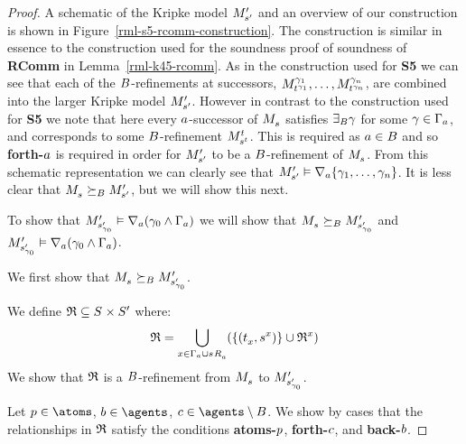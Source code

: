 \begin{proof}
A schematic of the Kripke model $\kPModelP{\kStateSP}$ and an overview of our construction is shown in Figure~\ref{rml-s5-rcomm-construction}.
The construction is similar in essence to the construction used for the soundness proof of soundness of {\bf RComm} in Lemma~\ref{rml-k45-rcomm}.
As in the construction used for {\bf S5} we can see that each of the $\agentsB$-refinements at successors, $\kPModel[\gamma_1]{\kStateT[\gamma_1]}, \dots, \kPModel[\gamma_n]{\kStateT[\gamma_n]}$, are combined into the larger Kripke model $\kPModelP{\kStateSP}$.
However in contrast to the construction used for {\bf S5} we note that here every $\agentA$-successor of $\kPModel{\kStateS}$ satisfies $\somerefsBs \gamma$ for some $\gamma \in \Gamma_\agentA$, and corresponds to some $\agentsB$-refinement $\kPModel[\kStateT]{\kStateS[\kStateT]}$.
This is required as $\agentA \in \agentsB$ and so {\bf forth-$\agentA$} is required in order for $\kPModelP{\kStateSP}$ to be a $\agentsB$-refinement of $\kPModel{\kStateS}$.
From this schematic representation we can clearly see that $\kPModelP{\kStateSP} \entails \coversA \{\gamma_1, \dots, \gamma_n\}$.
It is less clear that $\kPModel{\kStateS} \simulatesBs \kPModelP{\kStateSP}$, but we will show this next.

To show that $\kPModelP{\kStateSP_{\gamma_0}} \entails \coversA (\gamma_0 \land \Gamma_\agentA)$ we will show that $\kPModel{\kStateS} \simulatesBs \kPModelP{\kStateSP_{\gamma_0}}$ and $\kPModelP{\kStateSP_{\gamma_0}} \entails \coversA (\gamma_0 \land \Gamma_\agentA)$.

We first show that $\kPModel{\kStateS} \simulatesBs \kPModelP{\kStateSP_{\gamma_0}}$.

We define $\refinement \subseteq \kStates \times \kStatesP$ where:
$$
\refinement = \bigcup_{x \in \Gamma_\agentA \cup \kSuccessorsA{\kStateS}} (\{(\kStateT_x, \kStateS[x])\} \cup \refinement^x)
$$
We show that $\refinement$ is a $\agentsB$-refinement from $\kPModel{\kStateS}$ to $\kPModelP{\kStateSP_{\gamma_0}}$.

Let $\atomP \in \atoms$, $\agentB \in \agents$, $\agentC \in \agents \setminus \agentsB$.
We show by cases that the relationships in $\refinement$ satisfy the conditions {\bf atoms-$\atomP$}, {\bf forth-$\agentC$}, and {\bf back-$\agentB$}.


\end{proof}
